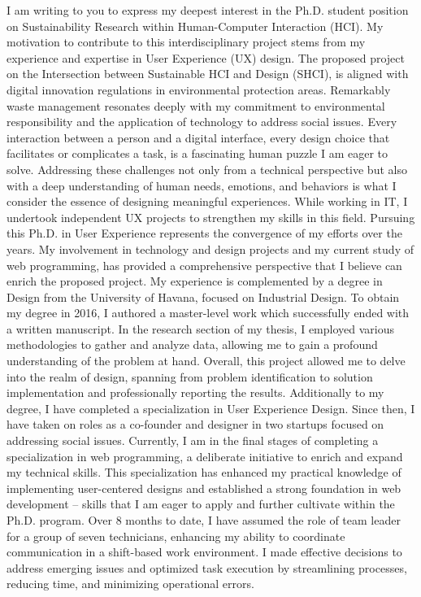 
I am writing to you to express my deepest interest in the Ph.D. student position on Sustainability Research within Human-Computer Interaction (HCI). My motivation to contribute to this interdisciplinary project stems from my experience and expertise in User Experience (UX) design. The proposed project on the Intersection between Sustainable HCI and Design (SHCI), is aligned with digital innovation regulations in environmental protection areas. Remarkably waste management resonates deeply with my commitment to environmental responsibility and the application of technology to address social issues. Every interaction between a person and a digital interface, every design choice that facilitates or complicates a task, is a fascinating human puzzle I am eager to solve. Addressing these challenges not only from a technical perspective but also with a deep understanding of human needs, emotions, and behaviors is what I consider the essence of designing meaningful experiences. While working in IT, I undertook independent UX projects to strengthen my skills in this field. Pursuing this Ph.D. in User Experience represents the convergence of my efforts over the years. My involvement in technology and design projects and my current study of web programming, has provided a comprehensive perspective that I believe can enrich the proposed project.
My experience is complemented by a degree in Design from the University of Havana, focused on Industrial Design. To obtain my degree in 2016, I authored a master-level work which successfully ended with a written manuscript. In the research section of my thesis, I employed various methodologies to gather and analyze data, allowing me to gain a profound understanding of the problem at hand. Overall, this project allowed me to delve into the realm of design, spanning from problem identification to solution implementation and professionally reporting the results.
Additionally to my degree, I have completed a specialization in User Experience Design. Since then, I have taken on roles as a co-founder and designer in two startups focused on addressing social issues.
Currently, I am in the final stages of completing a specialization in web programming, a deliberate initiative to enrich and expand my technical skills. This specialization has enhanced my practical knowledge of implementing user-centered designs and established a strong foundation in web development – skills that I am eager to apply and further cultivate within the Ph.D. program.
Over 8 months to date, I have assumed the role of team leader for a group of seven technicians, enhancing my ability to coordinate communication in a shift-based work environment. I made effective decisions to address emerging issues and optimized task execution by streamlining processes, reducing time, and minimizing operational errors. 

